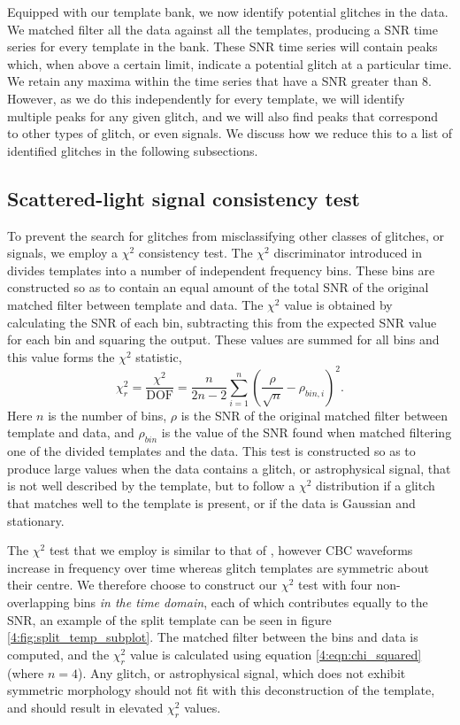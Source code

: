 Equipped with our template bank, we now identify potential \scladj glitches in the data. We matched filter all the data against all the templates, producing a SNR time series for every template in the bank. These SNR time series will contain peaks which, when above a certain limit, indicate a potential \scladj glitch at a particular time. We retain any maxima within the time series that have a SNR greater than 8. However, as we do this independently for every template, we will identify multiple peaks for any given glitch, and we will also find peaks that correspond to other types of glitch, or even \gwadj signals. We discuss how we reduce this to a list of identified \scladj glitches in the following subsections.

\subsection{Scattered-light signal consistency test}

To prevent the search for \scladj glitches from misclassifying other classes of glitches, or \gwadj signals, we employ a $\chi^2$ consistency test. The $\chi^2$ discriminator introduced in \cite{Allen_Chi:2005} divides \gwadj templates into a number of independent frequency bins. These bins are constructed so as to contain an equal amount of the total SNR of the original matched filter between template and data. The $\chi^{2}$ value is obtained by calculating the SNR of each bin, subtracting this from the expected SNR value for each bin and squaring the output. These values are summed for all bins and this value forms the $\chi^{2}$ statistic,
%
\begin{equation}
  \chi_{r}^{2} = \frac{\chi^{2}}{\textrm{DOF}} = \frac{n}{2n - 2} \sum_{i=1}^n \left(\frac{\rho}{\sqrt{n}} - \rho_{bin,i}\right)^2.
  \label{4:eqn:chi_squared}
\end{equation}
%
Here $n$ is the number of bins, $\rho$ is the SNR of the original matched filter between template and data, and $\rho_{bin}$ is the value of the SNR found when matched filtering one of the divided templates and the data. This test is constructed so as to produce large values when the data contains a glitch, or astrophysical signal, that is not well described by the template, but to follow a $\chi^2$ distribution if a glitch that matches well to the template is present, or if the data is Gaussian and stationary.

The $\chi^2$ test that we employ is similar to that of \cite{Allen_Chi:2005}, however CBC waveforms increase in frequency over time whereas \scladj glitch templates are symmetric about their centre. We therefore choose to construct our $\chi^2$ test with four non-overlapping bins \emph{in the time domain}, each of which contributes equally to the SNR, an example of the split template can be seen in figure \ref{4:fig:split_temp_subplot}. The matched filter between the bins and data is computed, and the $\chi_{r}^{2}$ value is calculated using equation \ref{4:eqn:chi_squared} (where $n=4$). Any glitch, or astrophysical signal, which does not exhibit symmetric morphology should not fit with this deconstruction of the template, and should result in elevated $\chi_{r}^{2}$ values.

